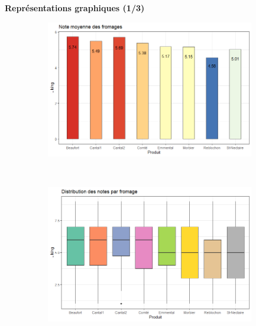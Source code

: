 \documentclass[aspectratio=169,xcolor=dvipsnames]{beamer}
\begin{document}
\begin{frame}
\textcolor{nyubluedarker}{\faChartBar \ \textbf{Représentations graphiques (1/3)}}

	\medskip

	\begin{figure}
	\centering
	\begin{subfigure}{0.5\textwidth}
	\includegraphics[width=\textwidth]{note_fromages.png}
	\end{subfigure}~
	\begin{subfigure}{0.5\textwidth}
	\includegraphics[width=\textwidth]{boxplots_notes_fromages.png}
	\end{subfigure}
	\end{figure}

\end{frame}
\end{document}
